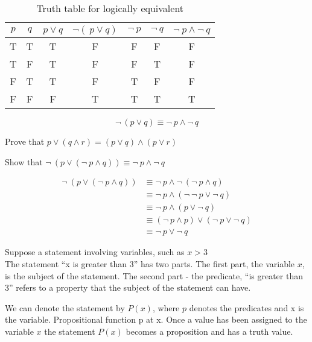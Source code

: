 \documentclass[../main-sheet.tex]{subfiles}
\begin{document}
\begin{table}[H]
    \centering
    \begin{tabular}{ccccccc}
        \toprule
        $ p $ & $ q $ & \(p\vee q\) & \(\neg(\ p\vee q)\) & \(\neg\ p\) & \(\neg\ q\) & \(\neg\ p\wedge \neg\ q\) \\ \midrule
        T     & T     & T           & F                   & F           & F           & F                         \\ 
        T     & F     & T           & F                   & F           & T           & F                         \\ 
        F     & T     & T           & F                   & T           & F           & F                         \\ 
        F     & F     & F           & T                   & T           & T           & T                         \\ \bottomrule
    \end{tabular}
    \caption{Truth table for logically equivalent}
    \[\neg\ (p\vee q)\equiv \neg\ p\wedge \neg\ q\]
\end{table}
\begin{prob}
    Prove that \(p\vee(q\wedge r)=(p\vee q)\wedge(p\vee r)\)
\end{prob}
\begin{prob}
    Show that \(\neg\ (p\vee(\neg\ p\wedge q))\equiv\neg\ p \wedge \neg\ q\)
\end{prob}
\begin{soln}
    \begin{align*}
        \neg\ (p\vee(\neg\ p\wedge q)) & \equiv \neg\ p \wedge \neg\ (\neg\ p \wedge q)       \\
                                       & \equiv \neg\ p \wedge (\neg\ \neg\ p\vee \neg\ q)    \\
                                       & \equiv \neg\ p \wedge(p\vee \neg\ q)                 \\
                                       & \equiv (\neg\ p\wedge p) \vee (\neg\ p \vee \neg\ q) \\
                                       & \equiv \neg\ p \vee \neg\ q
    \end{align*}
\end{soln}
\begin{defn}[Predicates]
    Suppose a statement involving variables, such as \(x>3\)\\
    The statement ``x is greater than 3'' has two parts.
    The first part, the variable $ x $, is the subject of the statement.
    The second part - the predicate, ``is greater than 3'' refers to a property that the subject of the statement can have.

    We can denote the statement by \(P(x)\), where $ p $ denotes the predicates and x is the variable.
    Propositional function p at x. Once a value has been assigned to the variable $ x $ the statement \(P(x)\) becomes a proposition and has a truth value.
\end{defn}
\end{document}
